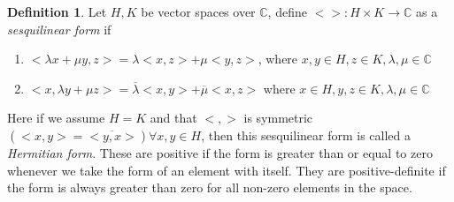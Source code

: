 \documentclass[12pt]{book}
\theoremstyle{definition}
\newtheorem*{defn}{Definition}
\begin{document}
\begin{defn}
    Let $H, K$ be vector spaces over $\mathbb{C}$, define $<>: H \times K \to \mathbb{C}$ as a \textit{sesquilinear form} if \begin{enumerate}
        \item $< \lambda x + \mu y, z> = \lambda<x, z> + \mu<y, z>$, where $x, y \in H, z \in K, \lambda, \mu \in \mathbb{C}$
        \item $<x, \lambda y + \mu z> = \overline{\lambda}<x, y> + \overline{\mu}<x, z>$ where $ x \in H, y, z \in K, \lambda, \mu \in \mathbb{C}$
    \end{enumerate}
    Here if we assume $H = K$ and that $<,>$ is symmetric $(<x,y> = \overline{<y, x>}) \forall x, y \in H$, then this sesquilinear form is called a \textit{Hermitian form}. These are positive if the form is greater than or equal to zero whenever we take the form of an element with itself. They are positive-definite if the form is always greater than zero for all non-zero elements in the space. 
\end{defn}
\end{document}

